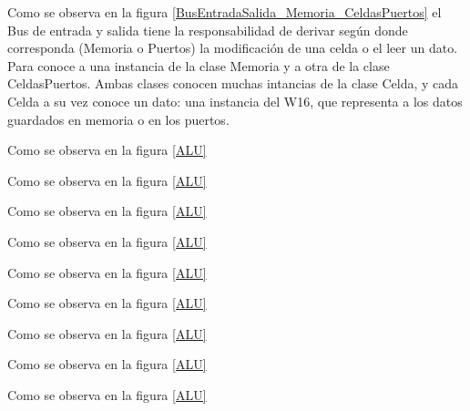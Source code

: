 Como se observa en la figura \ref{BusEntradaSalida_Memoria_CeldasPuertos} el Bus de entrada y salida tiene la responsabilidad de derivar según donde corresponda (Memoria o Puertos) la modificación de una celda o el leer un dato. Para conoce a una instancia de la clase Memoria y a otra de la clase CeldasPuertos. 
Ambas clases conocen muchas intancias de la clase Celda, y cada Celda a su vez conoce un dato: una instancia del W16, que representa a los datos guardados en memoria o en los puertos.  


Como se observa en la figura \ref{ALU}


Como se observa en la figura \ref{ALU}


Como se observa en la figura \ref{ALU}


Como se observa en la figura \ref{ALU}


Como se observa en la figura \ref{ALU}


Como se observa en la figura \ref{ALU}


Como se observa en la figura \ref{ALU}


Como se observa en la figura \ref{ALU}



Como se observa en la figura \ref{ALU}





